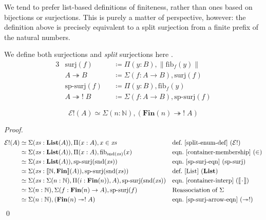 We tend to prefer list-based definitions of finiteness, rather than ones based
on bijections or surjections.
This is purely a matter of perspective, however: the definition above is
precisely equivalent to a split surjection from a finite prefix of the natural
numbers.
\begin{definition}[Surjections] \label{surjections}
  We define both surjections and \emph{split} surjections here \cite[definition
  4.6.1]{hottbook}.
  \begin{alignat}{3}
    &\text{surj}(f)             &&\coloneqq \Pi(y : B) , \lVert \text{fib}_f(y) \rVert \\
    &A \twoheadrightarrow B     &&\coloneqq \Sigma (f : A \rightarrow B) , \text{surj}(f) \label{surj-arrow-eqn} \\
    &\text{sp-surj}(f)          &&\coloneqq \Pi(y : B) , \text{fib}_f(y) \label{sp-surj-eqn} \\
    &A \twoheadrightarrow! \; B &&\coloneqq \Sigma (f : A \rightarrow B) , \text{sp-surj}(f) \label{sp-surj-arrow-eqn}
  \end{alignat}
\end{definition}
\begin{lemma} \label{split-enum-is-split-surj}
  \begin{equation}
    \mathcal{E}!(A) \simeq \Sigma (n : \mathbb{N}) , \left( \mathbf{Fin}(n) \twoheadrightarrow ! \; A \right)
  \end{equation}
\end{lemma}
\begin{proof}
  \begin{align*}
    \mathcal{E}!(A)
    & \simeq \Sigma (\mathit{xs} : \textbf{List}(A)) , \Pi {(x : A)} , x \in \mathit{xs}
    && \text{def.~\ref{split-enum-def} }(\mathcal{E}!)
    \\
    & \simeq \Sigma (\mathit{xs} : \textbf{List}(A)) , \Pi {(x : A)} , \text{fib}_{\text{snd}(\mathit{xs})}(x)
    && \text{eqn.~\ref{container-membership} } (\in)
    \\
    & \simeq \Sigma (\mathit{xs} : \textbf{List}(A)) , \text{sp-surj}(\text{snd}(\mathit{xs}))
    && \text{eqn.~\ref{sp-surj-eqn} (sp-surj)}
    \\
    & \simeq \Sigma (\mathit{xs} : \llbracket \mathbb{N} , \mathbf{Fin} \rrbracket (A)) , \text{sp-surj}(\text{snd}(\mathit{xs}))
    && \text{def.~\ref{List} } (\mathbf{List})
    \\
    & \simeq \Sigma (\mathit{xs} : \Sigma (n : \mathbb{N}) , \Pi (i : \mathbf{Fin}(n)) , A) , \text{sp-surj}(\text{snd}(\mathit{xs}))
    && \text{eqn.~\ref{container-interp} } (\llbracket {\mkern 2mu\cdot\mkern 2mu} \rrbracket)
    \\
    & \simeq \Sigma (n : \mathbb{N}) , \Sigma (f : \mathbf{Fin}(n) \rightarrow A) , \text{sp-surj}(f)
    && \text{Reassociation of } \Sigma
    \\
    & \simeq \Sigma (n : \mathbb{N}) , ( \mathbf{Fin}(n) \twoheadrightarrow ! \; A )
    && \text{eqn.~\ref{sp-surj-arrow-eqn} } (\twoheadrightarrow!)
  \end{align*}
  \qed
\end{proof}

